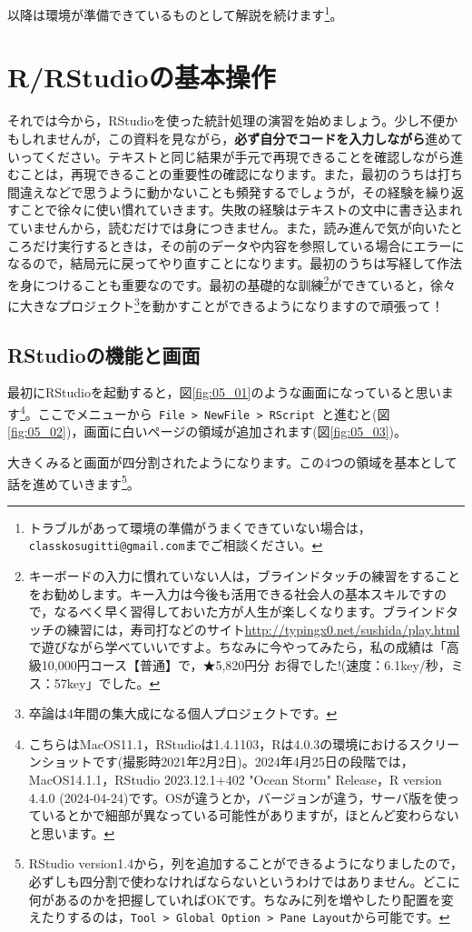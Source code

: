 \documentclass{ltjsbook}
\begin{document}
以降は環境が準備できているものとして解説を続けます\footnote{トラブルがあって環境の準備がうまくできていない場合は，\texttt{classkosugitti@gmail.com}までご相談ください。}。

\section{R/RStudioの基本操作}
それでは今から，RStudioを使った統計処理の演習を始めましょう。少し不便かもしれませんが，この資料を見ながら，\textbf{必ず自分でコードを入力しながら}進めていってください。テキストと同じ結果が手元で再現できることを確認しながら進むことは，再現できることの重要性の確認になります。また，最初のうちは打ち間違えなどで思うように動かないことも頻発するでしょうが，その経験を繰り返すことで徐々に使い慣れていきます。失敗の経験はテキストの文中に書き込まれていませんから，読むだけでは身につきません。また，読み進んで気が向いたところだけ実行するときは，その前のデータや内容を参照している場合にエラーになるので，結局元に戻ってやり直すことになります。最初のうちは写経して作法を身につけることも重要なのです。最初の基礎的な訓練\footnote{キーボードの入力に慣れていない人は，ブラインドタッチの練習をすることをお勧めします。キー入力は今後も活用できる社会人の基本スキルですので，なるべく早く習得しておいた方が人生が楽しくなります。ブラインドタッチの練習には，寿司打などのサイト\url{http://typingx0.net/sushida/play.html}で遊びながら学べていいですよ。ちなみに今やってみたら，私の成績は「高級10,000円コース【普通】で，★5,820円分 お得でした!(速度：6.1key/秒，ミス：57key」でした。}ができていると，徐々に大きなプロジェクト\footnote{卒論は4年間の集大成になる個人プロジェクトです。}を動かすことができるようになりますので頑張って！

\subsection{RStudioの機能と画面}
最初にRStudioを起動すると，図\ref{fig:05_01}のような画面になっていると思います\footnote{こちらはMacOS11.1，RStudioは1.4.1103，Rは4.0.3の環境におけるスクリーンショットです(撮影時2021年2月2日)。2024年4月25日の段階では，MacOS14.1.1，RStudio 2023.12.1+402 "Ocean Storm" Release，R version 4.4.0 (2024-04-24)です。OSが違うとか，バージョンが違う，サーバ版を使っているとかで細部が異なっている可能性がありますが，ほとんど変わらないと思います。}。ここでメニューから\verb| File > NewFile > RScript |と進むと(図\ref{fig:05_02})，画面に白いページの領域が追加されます(図\ref{fig:05_03})。

大きくみると画面が四分割されたようになります。この4つの領域を基本として話を進めていきます\footnote{RStudio version1.4から，列を追加することができるようになりましたので，必ずしも四分割で使わなければならないというわけではありません。どこに何があるのかを把握していればOKです。ちなみに列を増やしたり配置を変えたりするのは，\verb|Tool > Global Option > Pane Layout|から可能です。}。
\end{document}
